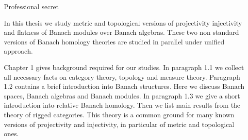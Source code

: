 \documentclass[11pt, a4paper, oneside]{Thesis} %
\begin{document}
\begin{flushright}
Professional secret
\end{flushright}

\vfill\vfill\vfill\vfill\vfill\vfill\null %

\clearpage %




In this thesis we study metric and topological versions of projectivity injectivity and flatness of Banach modules over Banach algebras. These two non standard versions of Banach homology theories are studied in parallel under unified approach.

Chapter 1 gives background required for our studies. In paragraph 1.1 we collect all necessary facts on category theory, topology and measure theory. Paragraph 1.2 contains a brief introduction into Banach structures. Here we discuss Banach spaces, Banach algebras and Banach modules. In paragraph 1.3 we give a short introduction into relative Banach homology. Then we list main results from the theory of rigged categories. This theory is a common ground for many known versions of projectivity and injectivity, in particular of metric and topological ones.
\end{document}
